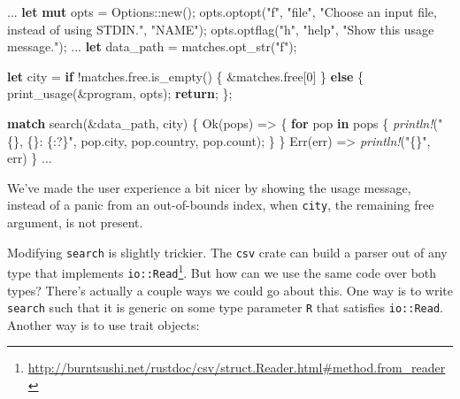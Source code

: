 \documentclass[a4paper,]{book}
\newenvironment{Shaded}{\begin{snugshade}}{\end{snugshade}}
\newcommand{\KeywordTok}[1]{\textcolor[rgb]{0.13,0.29,0.53}{\textbf{{#1}}}}
\newcommand{\DecValTok}[1]{\textcolor[rgb]{0.00,0.00,0.81}{{#1}}}
\newcommand{\ConstantTok}[1]{\textcolor[rgb]{0.00,0.00,0.00}{{#1}}}
\newcommand{\StringTok}[1]{\textcolor[rgb]{0.31,0.60,0.02}{{#1}}}
\newcommand{\PreprocessorTok}[1]{\textcolor[rgb]{0.56,0.35,0.01}{\textit{{#1}}}}
\newcommand{\NormalTok}[1]{{#1}}
\renewcommand{\href}[2]{#2\footnote{\url{#1}}}
\begin{document}
\begin{Shaded}
\begin{Highlighting}[]
\NormalTok{...}
    \KeywordTok{let} \KeywordTok{mut} \NormalTok{opts = Options::new();}
    \NormalTok{opts.optopt(}\StringTok{"f"}\NormalTok{, }\StringTok{"file"}\NormalTok{, }\StringTok{"Choose an input file, instead of using STDIN."}\NormalTok{, }\StringTok{"NAME"}\NormalTok{);}
    \NormalTok{opts.optflag(}\StringTok{"h"}\NormalTok{, }\StringTok{"help"}\NormalTok{, }\StringTok{"Show this usage message."}\NormalTok{);}
    \NormalTok{...}
    \KeywordTok{let} \NormalTok{data_path = matches.opt_str(}\StringTok{"f"}\NormalTok{);}

    \KeywordTok{let} \NormalTok{city = }\KeywordTok{if} \NormalTok{!matches.free.is_empty() \{}
        \NormalTok{&matches.free[}\DecValTok{0}\NormalTok{]}
    \NormalTok{\} }\KeywordTok{else} \NormalTok{\{}
        \NormalTok{print_usage(&program, opts);}
        \KeywordTok{return}\NormalTok{;}
    \NormalTok{\};}

    \KeywordTok{match} \NormalTok{search(&data_path, city) \{}
        \ConstantTok{Ok}\NormalTok{(pops) => \{}
            \KeywordTok{for} \NormalTok{pop }\KeywordTok{in} \NormalTok{pops \{}
                \PreprocessorTok{println!}\NormalTok{(}\StringTok{"\{\}, \{\}: \{:?\}"}\NormalTok{, pop.city, pop.country, pop.count);}
            \NormalTok{\}}
        \NormalTok{\}}
        \ConstantTok{Err}\NormalTok{(err) => }\PreprocessorTok{println!}\NormalTok{(}\StringTok{"\{\}"}\NormalTok{, err)}
    \NormalTok{\}}
\NormalTok{...}
\end{Highlighting}
\end{Shaded}

We've made the user experience a bit nicer by showing the usage message,
instead of a panic from an out-of-bounds index, when \texttt{city}, the
remaining free argument, is not present.

Modifying \texttt{search} is slightly trickier. The \texttt{csv} crate
can build a parser out of
\href{http://burntsushi.net/rustdoc/csv/struct.Reader.html\#method.from_reader}{any
type that implements \texttt{io::Read}}. But how can we use the same
code over both types? There's actually a couple ways we could go about
this. One way is to write \texttt{search} such that it is generic on
some type parameter \texttt{R} that satisfies \texttt{io::Read}. Another
way is to use trait objects:
\end{document}
